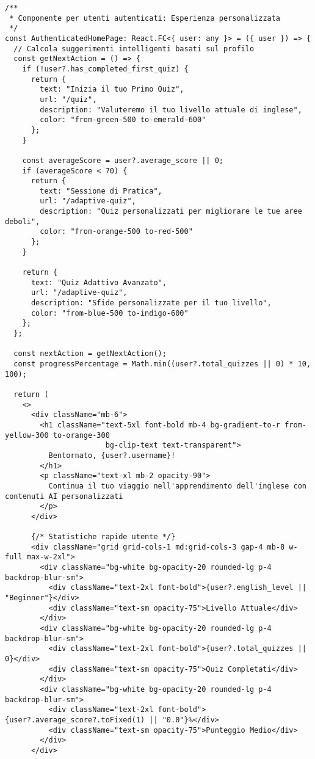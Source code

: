 \documentclass[a4paper, 14pt, oneside]{extbook}
\begin{document}
\begin{lstlisting}[style=javascriptstyle, caption=Componente App React - Orchestrazione Intelligente, label=lst:app-component]
/**
 * Componente per utenti autenticati: Esperienza personalizzata
 */
const AuthenticatedHomePage: React.FC<{ user: any }> = ({ user }) => {
  // Calcola suggerimenti intelligenti basati sul profilo
  const getNextAction = () => {
    if (!user?.has_completed_first_quiz) {
      return {
        text: "Inizia il tuo Primo Quiz",
        url: "/quiz",
        description: "Valuteremo il tuo livello attuale di inglese",
        color: "from-green-500 to-emerald-600"
      };
    }
    
    const averageScore = user?.average_score || 0;
    if (averageScore < 70) {
      return {
        text: "Sessione di Pratica",
        url: "/adaptive-quiz",
        description: "Quiz personalizzati per migliorare le tue aree deboli",
        color: "from-orange-500 to-red-500"
      };
    }
    
    return {
      text: "Quiz Adattivo Avanzato",
      url: "/adaptive-quiz",
      description: "Sfide personalizzate per il tuo livello",
      color: "from-blue-500 to-indigo-600"
    };
  };

  const nextAction = getNextAction();
  const progressPercentage = Math.min((user?.total_quizzes || 0) * 10, 100);

  return (
    <>
      <div className="mb-6">
        <h1 className="text-5xl font-bold mb-4 bg-gradient-to-r from-yellow-300 to-orange-300 
                       bg-clip-text text-transparent">
          Bentornato, {user?.username}!
        </h1>
        <p className="text-xl mb-2 opacity-90">
          Continua il tuo viaggio nell'apprendimento dell'inglese con contenuti AI personalizzati
        </p>
      </div>

      {/* Statistiche rapide utente */}
      <div className="grid grid-cols-1 md:grid-cols-3 gap-4 mb-8 w-full max-w-2xl">
        <div className="bg-white bg-opacity-20 rounded-lg p-4 backdrop-blur-sm">
          <div className="text-2xl font-bold">{user?.english_level || "Beginner"}</div>
          <div className="text-sm opacity-75">Livello Attuale</div>
        </div>
        <div className="bg-white bg-opacity-20 rounded-lg p-4 backdrop-blur-sm">
          <div className="text-2xl font-bold">{user?.total_quizzes || 0}</div>
          <div className="text-sm opacity-75">Quiz Completati</div>
        </div>
        <div className="bg-white bg-opacity-20 rounded-lg p-4 backdrop-blur-sm">
          <div className="text-2xl font-bold">{user?.average_score?.toFixed(1) || "0.0"}%</div>
          <div className="text-sm opacity-75">Punteggio Medio</div>
        </div>
      </div>


\end{lstlisting}
\end{document}
